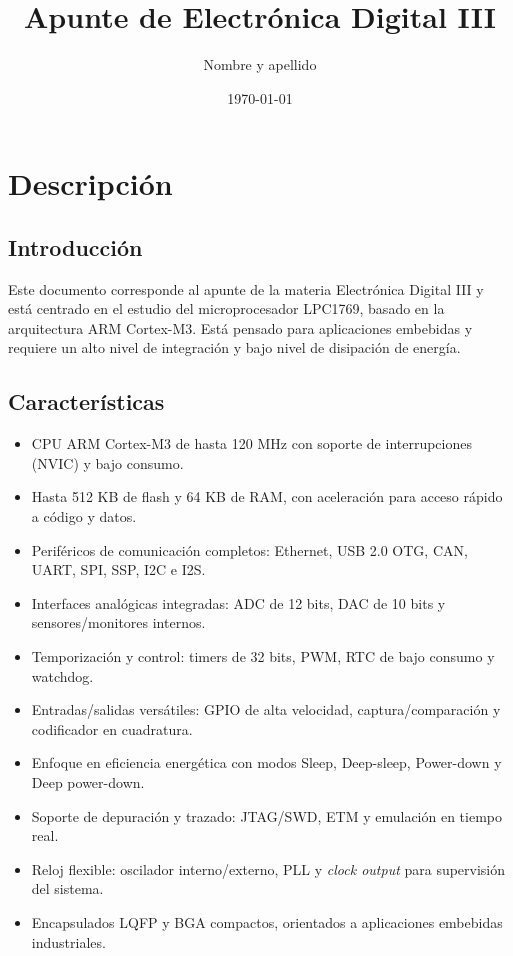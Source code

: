 ﻿\documentclass[11pt]{article}
\title{Apunte de Electrónica Digital III}
\author{Nombre y apellido}
\date{\today}
\begin{document}
\maketitle
\tableofcontents

\section{Descripción}
\subsection{Introducción}
Este documento corresponde al apunte de la materia Electrónica Digital III y está centrado en el estudio del microprocesador LPC1769, basado en la arquitectura ARM Cortex-M3. Está pensado para aplicaciones embebidas y requiere un alto nivel de integración y bajo nivel de disipación de energía.

\subsection{Características}
\begin{itemize}
  \item CPU ARM Cortex-M3 de hasta 120 MHz con soporte de interrupciones (NVIC) y bajo consumo.
  \item Hasta 512 KB de flash y 64 KB de RAM, con aceleración para acceso rápido a código y datos.
  \item Periféricos de comunicación completos: Ethernet, USB 2.0 OTG, CAN, UART, SPI, SSP, I2C e I2S.
  \item Interfaces analógicas integradas: ADC de 12 bits, DAC de 10 bits y sensores/monitores internos.
  \item Temporización y control: timers de 32 bits, PWM, RTC de bajo consumo y watchdog.
  \item Entradas/salidas versátiles: GPIO de alta velocidad, captura/comparación y codificador en cuadratura.
  \item Enfoque en eficiencia energética con modos Sleep, Deep-sleep, Power-down y Deep power-down.
  \item Soporte de depuración y trazado: JTAG/SWD, ETM y emulación en tiempo real.
  \item Reloj flexible: oscilador interno/externo, PLL y \textit{clock output} para supervisión del sistema.
  \item Encapsulados LQFP y BGA compactos, orientados a aplicaciones embebidas industriales.
\end{itemize}
\end{document}
